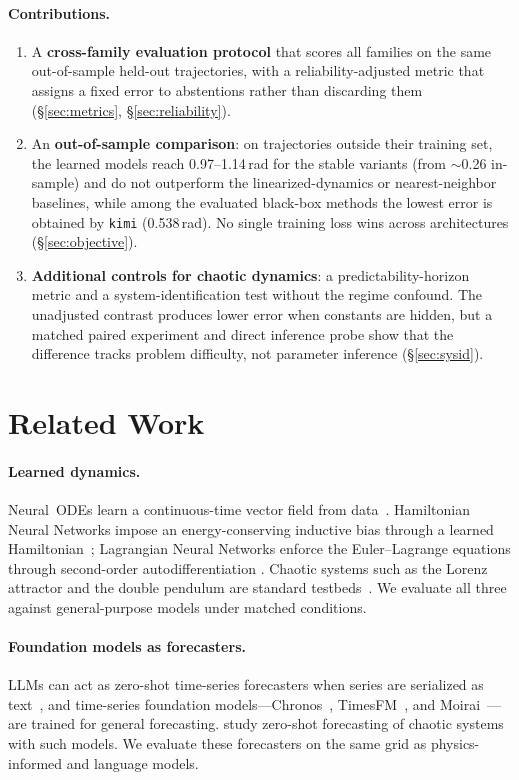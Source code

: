 \documentclass{article}
\begin{document}
\paragraph{Contributions.}
\begin{enumerate}[leftmargin=1.4em,itemsep=2pt,topsep=2pt]
\item A \textbf{cross-family evaluation protocol} that scores all families on the
same out-of-sample held-out trajectories, with a reliability-adjusted metric that assigns a
fixed error to abstentions rather than discarding them
(\S\ref{sec:metrics}, \S\ref{sec:reliability}).
\item An \textbf{out-of-sample comparison}: on trajectories outside their training set, the
learned models reach 0.97--1.14\,rad for the stable variants (from $\sim$0.26 in-sample) and
do not outperform the linearized-dynamics or nearest-neighbor baselines,
while among the evaluated black-box methods the lowest error is obtained by \texttt{kimi}
(0.538\,rad). No single training loss wins across architectures (\S\ref{sec:objective}).
\item \textbf{Additional controls for chaotic dynamics}: a predictability-horizon metric and a
system-identification test without the regime confound. The unadjusted contrast produces lower
error when constants are hidden, but a matched paired experiment and direct inference probe
show that the difference tracks problem difficulty, not parameter inference
(\S\ref{sec:sysid}).
\end{enumerate}

\section{Related Work}
\paragraph{Learned dynamics.} Neural~ODEs learn a continuous-time vector field from
data~\citep{chen2018node}. Hamiltonian Neural Networks impose an energy-conserving inductive
bias through a learned Hamiltonian~\citep{greydanus2019hnn}; Lagrangian Neural Networks
enforce the Euler--Lagrange equations through second-order autodifferentiation
\citep{cranmer2020lnn}. Chaotic systems such as the Lorenz attractor and the double pendulum
are standard testbeds~\citep{gilpin2021chaos}. We evaluate all three against general-purpose
models under matched conditions.

\paragraph{Foundation models as forecasters.} LLMs can act as zero-shot time-series
forecasters when series are serialized as text~\citep{gruver2023llmtime}, and time-series
foundation models---Chronos~\citep{ansari2024chronos}, TimesFM~\citep{das2024timesfm}, and
Moirai~\citep{woo2024moirai}---are trained for general forecasting.
\citet{zhang2025zeroshotchaos} study zero-shot forecasting of chaotic systems with such
models. We evaluate these forecasters on the same grid as physics-informed and language models.
\end{document}

